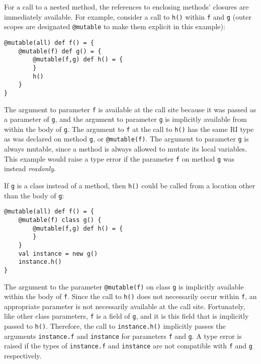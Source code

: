 \documentclass[letterpaper,11pt]{article}
\newcommand{\code}[1]{\lstinline$#1$}
\theoremstyle{definition}
\theoremstyle{remark}
\begin{document}
For a call to a nested method,
the references to enclosing methods' closures are immediately available.
For example, consider a call to \code{h()} within \code{f} and \code{g}
(outer scopes are designated \code{@mutable} to make them explicit
in this example):

\begin{lstlisting}
@mutable(all) def f() = {
	@mutable(f) def g() = {
		@mutable(f,g) def h() = {
		}
		h()
	}
}
\end{lstlisting}
The argument to parameter \code{f} is available at the call site
because it was passed as a parameter of \code{g},
and the argument to parameter \code{g} is implicitly available from within the
body of \code{g}.
The argument to \code{f} at the call to \code{h()} has the same RI type
as was declared on method \code{g}, or \code{@mutable(f)}.
The argument to parameter \code{g} is always mutable, since a method is always allowed to mutate its local
variables.
This example would raise a type error if the parameter \code{f} on method \code{g}
was instead \emph{readonly}.

If \code{g} is a class instead of a method,
then \code{h()} could be called from a location
other than the body of \code{g}:
\begin{lstlisting}
@mutable(all) def f() = {
	@mutable(f) class g() {
		@mutable(f,g) def h() = {
		}
	}
	val instance = new g()
	instance.h()
}
\end{lstlisting}
The argument to the parameter \code{@mutable(f)} on class \code{g}
is implicitly available within the body of \code{f}.
Since the call to \code{h()} does not necessarily occur within \code{f},
an appropriate parameter is not necessarily available at the call site.
Fortunately, like other class parameters, \code{f} is a field of \code{g},
and it is this field that is implicitly passed to \code{h()}.
Therefore, the call to \code{instance.h()} implicitly passes the
arguments \code{instance.f} and \code{instance} for parameters
\code{f} and \code{g}.
A type error is raised if the types of \code{instance.f} and \code{instance}
are not compatible with \code{f} and \code{g} respectively.

\begin{comment}
Therefore, for the purpose of type-checking the parameter \code{f}
on method \code{h}, it is sufficient to make sure that
the RI type of parameter \code{f} on method \code{h}
is a supertype of the RI type of parameter \code{f} on class \code{g}.
At the site of the call to \code{h}, the RI type of \code{instance}
must be a subtype of the parameter \code{g} on method \code{h}.
For example, the following code has two type errors:
\begin{lstlisting}
@mutable(all) def f() = {
	@readonly(f) class g() {
		@mutable(f,g) def h() = {  // error: mutable not a supertype of readonly
		}
	}
	val instance: g @readonly = new g()
	instance.h()   // error: readonly not a subtype of mutable
}
\end{lstlisting}
\end{comment}
\end{document}
